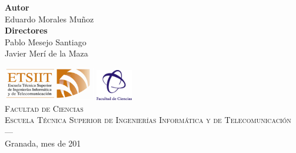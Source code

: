 \begin{titlepage}
\begin{minipage}{\textwidth}
\textbf{Autor}\\ {Eduardo Morales Muñoz}\\[2.5ex]
\textbf{Directores}\\
{Pablo Mesejo Santiago\\
Javier Merí de la Maza}\\[1cm]
\raggedright
\hspace{1.7cm}
\includegraphics[width=0.3\textwidth]{Plantilla_TFG_latex/imagenes/etsiit_logo.png} \hspace{2cm}
\includegraphics[width=0.12\textwidth]{Plantilla_TFG_latex/imagenes/fcienciasLogo.png}\\[0.1cm]
\centering
\textsc{Facultad de Ciencias \\ Escuela Técnica Superior de Ingenierías Informática y de Telecomunicación}\\
\textsc{---}\\
Granada, mes de 201
\end{minipage}
\end{titlepage}


